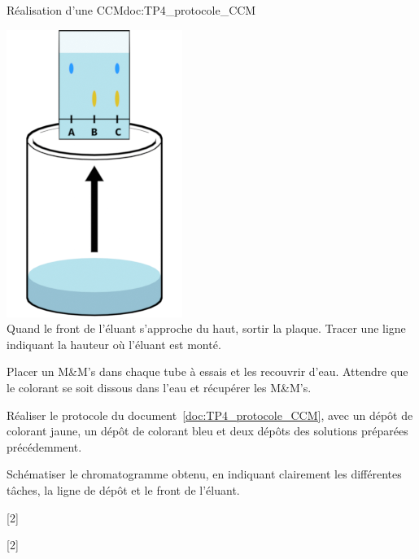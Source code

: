 \begin{doc}{Réalisation d'une CCM}{doc:TP4_protocole_CCM}
\begin{multicols}{2}
    \begin{center}
      \includegraphics[height=0.2\textheight]{images/chimie/CCM/CCM_protocole0006.png} \\      
      Quand le front de l'éluant s'approche du haut, sortir la plaque.
      Tracer une ligne indiquant la hauteur où l'éluant est monté.
    \end{center}
  \end{multicols}
\end{doc}


\mesure
Placer un M\&M's dans chaque tube à essais et les recouvrir d'eau.
Attendre que le colorant se soit dissous dans l'eau et récupérer les M\&M's.

\mesure
Réaliser le protocole du document~\ref{doc:TP4_protocole_CCM}, avec un dépôt de colorant jaune, un dépôt de colorant bleu et deux dépôts des solutions préparées précédemment.

\mesure
Schématiser le chromatogramme obtenu, en indiquant clairement les différentes tâches, la ligne de dépôt et le front de l'éluant.
\pasCorrection{\vfill}

[2]

[2]


